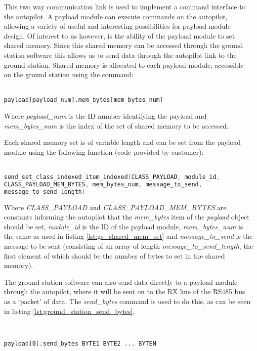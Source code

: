 This two way communication link is used to implement a command interface to 
the autopilot. A payload module can execute commands on the autopilot, 
allowing a variety of useful and interesting possibilities for payload
module design. Of interest to us however, is the ability of the payload
module to set shared memory. Since this shared memory can be accessed 
through the ground station software this allows us to send data through the
autopilot link to the ground station. Shared memory is allocated to 
each payload module, accessible on the ground station using the command:
~\\
~\\
\begin{lstlisting}[caption={Accessing shared memory from ground station}, label=lst:gs_shared_mem_set]
payload[payload_num].mem_bytes[mem_bytes_num]
\end{lstlisting}

Where \emph{payload\_num} is the ID number identifying the payload and 
\emph{mem\_bytes\_num} is the index of the set of shared memory to be accessed.

Each shared memory set is of variable length and can be set from the payload 
module using the following function (code provided by customer):
~\\
~\\
\begin{lstlisting}[language=C, caption={Setting shared memory from payload module}, label=lst:payload_shared_mem_set]
send_set_class_indexed_item_indexed(CLASS_PAYLOAD, module_id, 
CLASS_PAYLOAD_MEM_BYTES, mem_bytes_num, message_to_send,
message_to_send_length)
\end{lstlisting}

Where \emph{CLASS\_PAYLOAD} and \emph{CLASS\_PAYLOAD\_MEM\_BYTES} are constants 
informing the autopilot that the \emph{mem\_bytes} item of the \emph{payload} 
object should be set, \emph{module\_id} is the ID of the payload module,
\emph{mem\_bytes\_num} is the same as used in listing
\ref{lst:gs_shared_mem_set} and \emph{message\_to\_send} is the message to be 
sent (consisting of an array of length \emph{message\_to\_send\_length}, the 
first element of which should be the number of bytes to set in the shared 
memory).

The ground station software can also send data directly to a payload module 
through the autopilot, where it will be sent on to the RX line of the RS485
bus as a `packet' of data. The \emph{send\_bytes} command is used to do this, as can be seen in 
listing \ref{lst:ground_station_send_bytes}. 

~\\
\begin{lstlisting}[caption={Sending bytes 1 to N from ground station to payload module}, label=lst:ground_station_send_bytes]
payload[0].send_bytes BYTE1 BYTE2 ... BYTEN 
\end{lstlisting} 
